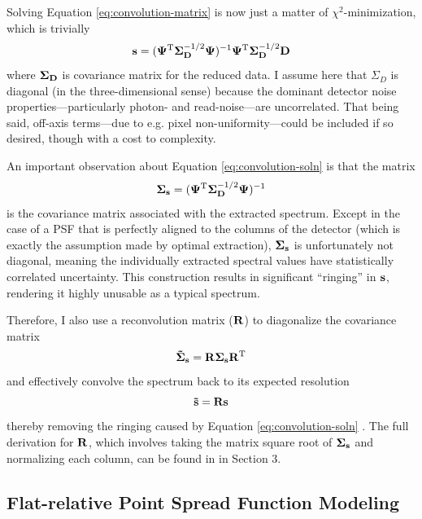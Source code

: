 Solving Equation \ref{eq:convolution-matrix} is now just a matter of $\chi^2$-minimization, which is trivially
\begin{equation}
    \vb{s} = (\vb{\Psi}^\mathrm{T} \vb{\Sigma}_{\vb{D}}^{-1/2} \vb{\Psi})^{-1} \vb{\Psi}^\mathrm{T} \vb{\Sigma}_{\vb{D}}^{-1/2} \vb{D}
    \label{eq:convolution-soln}
\end{equation}
where $\vb{\Sigma_D}$ is covariance matrix for the reduced data. I assume here that $\Sigma_D$ is diagonal (in the three-dimensional sense) because the dominant detector noise properties---particularly photon- and read-noise---are uncorrelated. That being said, off-axis terms---due to e.g. pixel non-uniformity---could be included if so desired, though with a cost to complexity.

An important observation about Equation \ref{eq:convolution-soln} is that the matrix
\begin{equation}
    \vb{\Sigma_s} = (\vb{\Psi}^\mathrm{T} \vb{\Sigma}_{\vb{D}}^{-1/2} \vb{\Psi})^{-1}
\end{equation}
is the covariance matrix associated with the extracted spectrum. Except in the case of a PSF that is perfectly aligned to the columns of the detector (which is exactly the assumption made by optimal extraction), $\vb{\Sigma_s}$ is unfortunately not diagonal, meaning the individually extracted spectral values have statistically correlated uncertainty. This construction results in significant ``ringing'' in $\vb{s}$, rendering it highly unusable as a typical spectrum.

Therefore, I also use a reconvolution matrix ($\vb{R}$) to diagonalize the covariance matrix
\begin{equation}
    \vb{\Tilde{\Sigma}_s} = \vb{R} \vb{\Sigma_s} \vb{R}^\mathrm{T}
\end{equation}
and effectively convolve the spectrum back to its expected resolution
\begin{equation}
    \vb{\Tilde{s}} = \vb{R} \vb{s}
\end{equation}
thereby removing the ringing caused by Equation \ref{eq:convolution-soln} \citep{bolton_spectro-perfectionism_2009}. The full derivation for $\vb{R}$, which involves taking the matrix square root of $\vb{\Sigma_s}$ and normalizing each column, can be found in \citet{bolton_spectro-perfectionism_2009} in Section 3.

\subsection{Flat-relative Point Spread Function Modeling} \label{pipeline2:spec-perf:psf}

